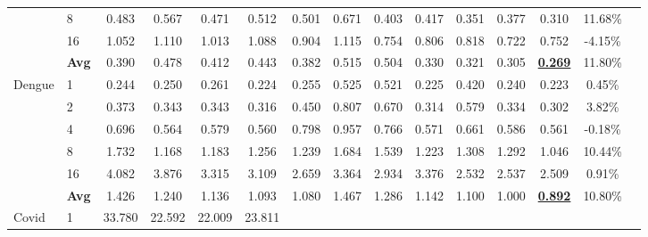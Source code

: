 \begin{table*}[t]
{\begin{tabular}{llccccccccccccc}
              & 8  
                & 0.483 & 0.567 & 0.471 & 0.512 
                & 0.501 & 0.671 & 0.403 & 0.417 
                & \cellcolor{low2}0.351 & \cellcolor{low3}0.377 & \cellcolor{low1}0.310 
                & 11.68\% \\[2pt]
              & 16 
                & 1.052 & 1.110 & 1.013 & 1.088 
                & 0.904 & 1.115 & \cellcolor{low3}0.754 & 0.806 
                & 0.818 & \cellcolor{low1}0.722 & \cellcolor{low2}0.752
                & -4.15\% \\[2pt]
              & \textbf{Avg} 
                & 0.390 & 0.478 & 0.412 & 0.443 
                & 0.382 & 0.515 & 0.504 & 0.330 
                & \cellcolor{low3}0.321 & \cellcolor{low2}0.305 
                & \cellcolor{low1}\textbf{\underline{0.269}}
                & 11.80\% \\
        \midrule
        \multirow{6}{*}{Dengue} 
          & 1  
            & 0.244 & 0.250 & 0.261 & \cellcolor{low2}0.224 
            & 0.255 & 0.525 & 0.521 & \cellcolor{low3}0.225 
            & 0.420 & 0.240 & \cellcolor{low1}0.223 
            & 0.45\% \\[2pt]
          & 2  
            & 0.373 & 0.343 & 0.343 & \cellcolor{low3}0.316 
            & 0.450 & 0.807 & 0.670 & \cellcolor{low2}0.314 
            & 0.579 & 0.334 & \cellcolor{low1}0.302
            & 3.82\% \\[2pt]
          & 4  
            & 0.696 & \cellcolor{low3}0.564 & 0.579 & \cellcolor{low1}0.560 
            & 0.798 & 0.957 & 0.766 & 0.571 
            & 0.661 & 0.586 & \cellcolor{low2}0.561 
            & -0.18\% \\[2pt]
          & 8  
            & 1.732 & \cellcolor{low2}1.168 & \cellcolor{low3}1.183 & 1.256 
            & 1.239 & 1.684 & 1.539 & 1.223 
            & 1.308 & 1.292 & \cellcolor{low1}1.046 
            & 10.44\% \\[2pt]
          & 16 
            & 4.082 & 3.876 & 3.315 & 3.109 
            & 2.659 & 3.364 & 2.934 & 3.376 
            & \cellcolor{low2}2.532 & \cellcolor{low3}2.537 & \cellcolor{low1}2.509
            & 0.91\% \\[2pt]
          & \textbf{Avg} 
            & 1.426 & 1.240 & 1.136 & 1.093 
            & \cellcolor{low3}1.080 & 1.467 & 1.286 & 1.142 
            & 1.100 & \cellcolor{low2}1.000 & \cellcolor{low1}\textbf{\underline{0.892}}
            & 10.80\% \\
        \midrule
        \multirow{6}{*}{Covid} 
          & 1  
            & 33.780 & \cellcolor{low2}22.592 & \cellcolor{low3}22.009 & 23.811 

\end{tabular}}
\end{table*}
